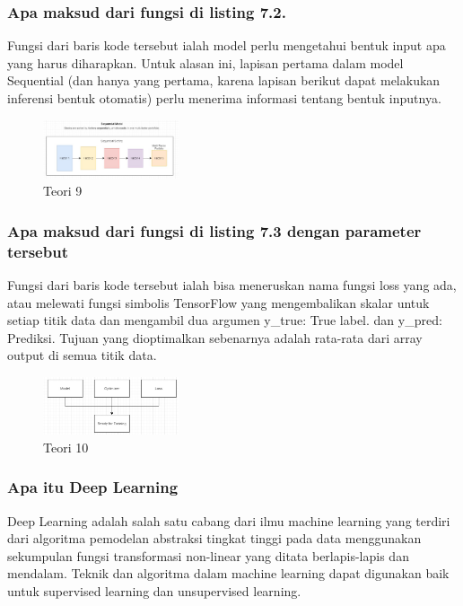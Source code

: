 \subsubsection{Apa maksud dari fungsi di listing 7.2.}
\hfill\break

Fungsi dari baris kode tersebut ialah model perlu mengetahui bentuk input apa yang harus diharapkan. Untuk alasan ini, lapisan pertama dalam model Sequential (dan hanya yang pertama, karena lapisan berikut dapat melakukan inferensi bentuk otomatis) perlu menerima informasi tentang bentuk inputnya.
\begin{figure}[H]
\centering
	\includegraphics[width=4cm]{figures/1174057/chapter7/9.jpg}
\caption{Teori 9}
\end{figure}

\subsubsection{Apa maksud dari fungsi di listing 7.3 dengan parameter tersebut}
\hfill\break

Fungsi dari baris kode tersebut ialah bisa meneruskan nama fungsi loss yang ada, atau melewati fungsi simbolis TensorFlow yang mengembalikan skalar untuk setiap titik data dan mengambil dua argumen y\_true: True label. dan  y\_pred: Prediksi. Tujuan yang dioptimalkan sebenarnya adalah rata-rata dari array output di semua titik data.
\begin{figure}[H]
\centering
	\includegraphics[width=4cm]{figures/1174057/chapter7/10.jpg}
\caption{Teori 10}
\end{figure}

\subsubsection{Apa itu Deep Learning}
\hfill\break
Deep Learning adalah salah satu cabang dari ilmu machine learning yang terdiri dari algoritma pemodelan abstraksi tingkat tinggi pada data menggunakan sekumpulan fungsi transformasi non-linear yang ditata berlapis-lapis dan mendalam. Teknik dan algoritma dalam machine learning dapat digunakan baik untuk supervised learning dan unsupervised learning.

